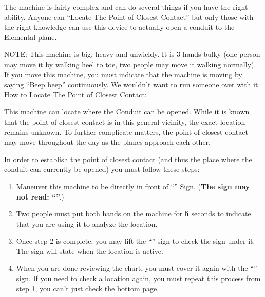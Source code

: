 \documentclass[green]{elementals}
\begin{document}
\name{\gConduitCover{}}


The machine is fairly complex and can do several things if you have the right ability. Anyone can ``Locate The Point of Closest Contact'' but only those with the right knowledge can use this device to actually open a conduit to the Elemental plane.

NOTE: This machine is big, heavy and unwieldy. It is 3-hands bulky (one person may move it by walking heel to toe, two people may move it walking normally). If you move this machine, you must indicate that the machine is moving by saying ``Beep beep'' continuously. We wouldn't want to run someone over with it.\\


{\large How to Locate The Point of Closest Contact:}

This machine can locate where the Conduit can be opened. While it is known that the point of closest contact is in this general vicinity, the exact location remains unknown. To further complicate matters, the point of closest contact may move throughout the day as the planes approach each other.

In order to establish the point of closest contact (and thus the place where the conduit can currently be opened) you must follow these steps:
\begin{enumerate}
  \item Maneuver this machine to be directly in front of ``\sLocationCoverSheet{}'' Sign. ({\bf The sign may not read: ``\sSealedLocationSheet{}''.})
  \item Two people must put both hands on the machine for {\bf 5} seconds to indicate that you are using it to analyze the location.
  \item Once step 2 is complete, you may lift the ``\sLocationCoverSheet{}'' sign to check the sign under it. The sign will state when the location is active.
  \item When you are done reviewing the chart, you must cover it again with the ``\sLocationCoverSheet{}'' sign. If you need to check a location again, you must repeat this process from step 1, you can't just check the bottom page.
\end{enumerate}
\end{document}

